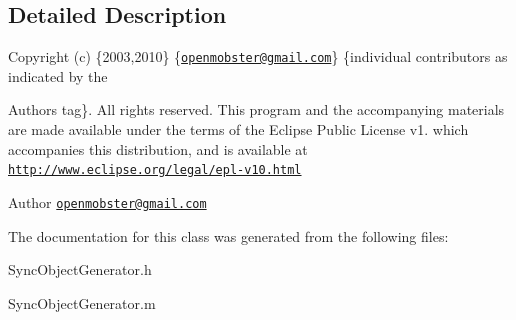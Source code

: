 \subsection{\-Detailed \-Description}
\-Copyright (c) \{2003,2010\} \{\href{mailto:openmobster@gmail.com}{\tt openmobster@gmail.\-com}\} \{individual contributors as indicated by the \begin{DoxyAuthor}{\-Authors}
tag\}. \-All rights reserved. \-This program and the accompanying materials are made available under the terms of the \-Eclipse \-Public \-License v1. which accompanies this distribution, and is available at \href{http://www.eclipse.org/legal/epl-v10.html}{\tt http\-://www.\-eclipse.\-org/legal/epl-\/v10.\-html}
\end{DoxyAuthor}
\begin{DoxyAuthor}{\-Author}
\href{mailto:openmobster@gmail.com}{\tt openmobster@gmail.\-com} 
\end{DoxyAuthor}


\-The documentation for this class was generated from the following files\-:\begin{DoxyCompactItemize}
\item 
\-Sync\-Object\-Generator.\-h\item 
\-Sync\-Object\-Generator.\-m\end{DoxyCompactItemize}
